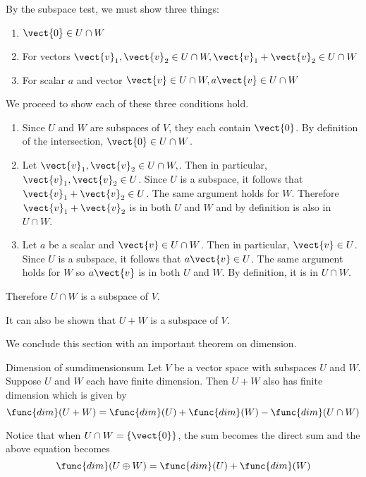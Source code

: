 \begin{solution}
By the subspace test, we must show three things:
\begin{enumerate}
\item $\vect{0} \in U \cap W$
\item For vectors $\vect{v}_1, \vect{v}_2 \in U \cap W, \vect{v}_1+\vect{v}_2 \in U \cap W$
\item For scalar $a$ and vector $\vect{v} \in U \cap W, a\vect{v} \in U \cap W$
\end{enumerate}

We proceed to show each of these three conditions hold.
\begin{enumerate}
\item 
Since $U$ and $W$ are subspaces of $V$, they each contain $\vect{0}$. By definition of the intersection, $\vect{0} \in U \cap W$. 

\item
Let  $\vect{v}_1, \vect{v}_2 \in U \cap W,$. Then in particular,  $\vect{v}_1, \vect{v}_2 \in U$. Since $U$ is a subspace, it follows that $ \vect{v}_1+\vect{v}_2 \in U$. The same argument holds for $W$. Therefore $\vect{v}_1+\vect{v}_2$ is in both $U$ and $W$ and by definition is also in $U \cap W$. 

\item 
Let $a$ be a scalar and $\vect{v} \in U \cap W$. Then in particular, $\vect{v} \in U$. Since $U$ is a subspace, it follows that $a \vect{v} \in U$. The same argument holds for $W$ so $a\vect{v}$ is in both $U$ and $W$. By definition, it is in $U \cap W$. 
\end{enumerate}

Therefore $U \cap W$ is a subspace of $V$. 
\end{solution}

It can also be shown that $U + W$ is a subspace of $V$.

We conclude this section with an important theorem on dimension.

\begin{theorem}{Dimension of sum}{dimensionsum}
Let $V$ be a vector space with subspaces $U$ and $W$. Suppose $U$ and $W$ each have finite dimension. Then $U + W$ also has finite dimension which is given by\[
\func{dim} (U+W) = \func{dim}(U) + \func{dim}(W) - \func{dim} (U \cap W)
\]
\end{theorem}

Notice that when $U \cap W = \left\{ \vect{0} \right\}$, the sum becomes the direct sum and the above equation becomes 
\[
\func{dim} (U \oplus W) = \func{dim}(U) + \func{dim}(W)
\]